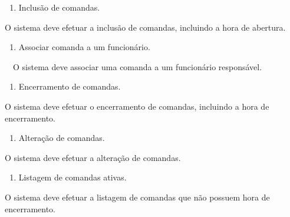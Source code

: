 \bigskip


\bigskip

\liststyleWWNumi
\setcounter{saveenum}{\value{enumi}}
\begin{enumerate}
\setcounter{enumi}{\value{saveenum}}
\item {
\textcolor[rgb]{0.078431375,0.09411765,0.13725491}{Inclusão de comandas.}}
\end{enumerate}
{
\textcolor[rgb]{0.078431375,0.09411765,0.13725491}{O sistema deve efetuar a inclusão de comandas, incluindo a hora de
abertura.}}

\liststyleWWNumi
\setcounter{saveenum}{\value{enumi}}
\begin{enumerate}
\setcounter{enumi}{\value{saveenum}}
\item {
\textcolor[rgb]{0.078431375,0.09411765,0.13725491}{Associar comanda a um funcionário.}}
\end{enumerate}
{
\textcolor[rgb]{0.078431375,0.09411765,0.13725491}{\ \ O sistema deve associar uma comanda a um funcionário
responsável.}}

\liststyleWWNumi
\setcounter{saveenum}{\value{enumi}}
\begin{enumerate}
\setcounter{enumi}{\value{saveenum}}
\item {
\textcolor[rgb]{0.078431375,0.09411765,0.13725491}{Encerramento de comandas.}}
\end{enumerate}
{
\textcolor[rgb]{0.078431375,0.09411765,0.13725491}{O sistema deve efetuar o encerramento de comandas, incluindo a hora
de encerramento.}}

\liststyleWWNumi
\setcounter{saveenum}{\value{enumi}}
\begin{enumerate}
\setcounter{enumi}{\value{saveenum}}
\item {
\textcolor[rgb]{0.078431375,0.09411765,0.13725491}{Alteração de comandas.}}
\end{enumerate}
{
\textcolor[rgb]{0.078431375,0.09411765,0.13725491}{O sistema deve efetuar a alteração de comandas.}}

\liststyleWWNumi
\setcounter{saveenum}{\value{enumi}}
\begin{enumerate}
\setcounter{enumi}{\value{saveenum}}
\item {
\textcolor[rgb]{0.078431375,0.09411765,0.13725491}{Listagem de comandas ativas.}}
\end{enumerate}
{
\textcolor[rgb]{0.078431375,0.09411765,0.13725491}{O sistema deve efetuar a listagem de comandas que não possuem hora de
encerramento.}}

